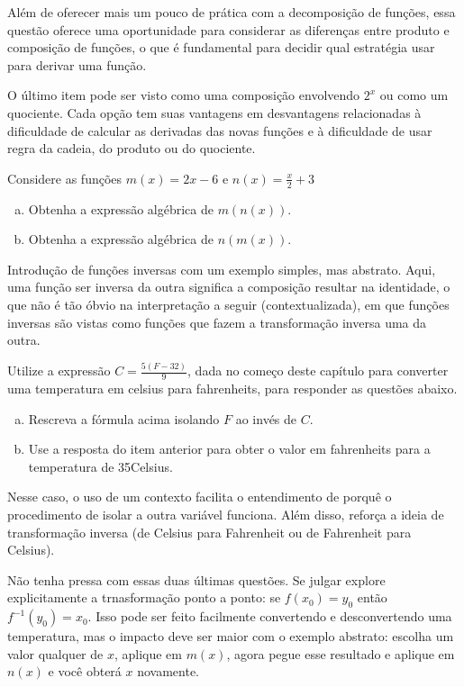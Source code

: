 \documentclass[main_estudante.tex]{subfiles}
\begin{document}
Além de oferecer mais um pouco de prática com a decomposição de funções, essa questão oferece uma oportunidade para considerar as diferenças entre produto e composição de funções, o que é fundamental para decidir qual estratégia usar para derivar uma função.

O último item pode ser visto como uma composição envolvendo $2^x$ ou como um quociente. Cada opção tem suas vantagens em desvantagens relacionadas à dificuldade de calcular as derivadas das novas funções e à dificuldade de usar regra da cadeia, do produto ou do quociente.

\begin{questao}
Considere as funções $m(x)=2x-6$ e $n(x)=\frac{x}{2}+3$
\begin{enumerate}[a)]
\item Obtenha a expressão algébrica de $m(n(x))$.
\item Obtenha a expressão algébrica de $n(m(x))$.
\end{enumerate}
\end{questao}

Introdução de funções inversas com um exemplo simples, mas abstrato. Aqui, uma função ser inversa da outra significa a composição resultar na identidade, o que não é tão óbvio na interpretação a seguir (contextualizada), em que funções inversas são vistas como funções que fazem a transformação inversa uma da outra.

\begin{questao}
Utilize a expressão $C=\frac{5(F-32)}{9}$, dada no começo deste capítulo para converter uma temperatura em celsius para fahrenheits, para responder as questões abaixo.
\begin{enumerate}[a)]
\item Rescreva a fórmula acima isolando $F$ ao invés de $C$.
\item Use a resposta do item anterior para obter o valor em fahrenheits para a temperatura de 35\degree Celsius.
\end{enumerate}
\end{questao}

Nesse caso, o uso de um contexto facilita o entendimento de porquê o procedimento de isolar a outra variável funciona. Além disso, reforça a ideia de transformação inversa (de Celsius para Fahrenheit ou de Fahrenheit para Celsius).

Não tenha pressa com essas duas últimas questões. Se julgar explore explicitamente a trnasformação ponto a ponto: se $f(x_0)=y_0$ então $f^{-1}(y_0)=x_0$. Isso pode ser feito facilmente convertendo e desconvertendo uma temperatura, mas o impacto deve ser maior com o exemplo abstrato: escolha um valor qualquer de $x$, aplique em $m(x)$, agora pegue esse resultado e aplique em $n(x)$ e você obterá $x$ novamente.
\end{document}
